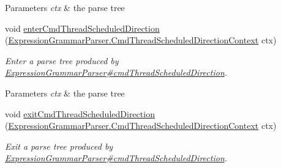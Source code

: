 \begin{DoxyCompactItemize}
\begin{DoxyCompactList}
\begin{DoxyParams}{Parameters}
{\em ctx} & the parse tree\\
\hline
\end{DoxyParams}
 \end{DoxyCompactList}\item 
void \hyperlink{classgov_1_1nasa_1_1jpf_1_1inspector_1_1server_1_1expression_1_1parser_1_1_expression_grammar_base_listener_a6fd4fec4668e2f124aa16d13c17d75f9}{enter\+Cmd\+Thread\+Scheduled\+Direction} (\hyperlink{classgov_1_1nasa_1_1jpf_1_1inspector_1_1server_1_1expression_1_1parser_1_1_expression_grammar_pa3ae49d5d83c380526042a5aff91ee0a2}{Expression\+Grammar\+Parser.\+Cmd\+Thread\+Scheduled\+Direction\+Context} ctx)
\begin{DoxyCompactList}\small\item\em Enter a parse tree produced by \hyperlink{classgov_1_1nasa_1_1jpf_1_1inspector_1_1server_1_1expression_1_1parser_1_1_expression_grammar_parser_aa1e14518e300b02c71f006c270cb4c41}{Expression\+Grammar\+Parser\#cmd\+Thread\+Scheduled\+Direction}.


\begin{DoxyParams}{Parameters}
{\em ctx} & the parse tree\\
\hline
\end{DoxyParams}
 \end{DoxyCompactList}\item 
void \hyperlink{classgov_1_1nasa_1_1jpf_1_1inspector_1_1server_1_1expression_1_1parser_1_1_expression_grammar_base_listener_aa4d738833499a5f67b879bb7d9d78961}{exit\+Cmd\+Thread\+Scheduled\+Direction} (\hyperlink{classgov_1_1nasa_1_1jpf_1_1inspector_1_1server_1_1expression_1_1parser_1_1_expression_grammar_pa3ae49d5d83c380526042a5aff91ee0a2}{Expression\+Grammar\+Parser.\+Cmd\+Thread\+Scheduled\+Direction\+Context} ctx)
\begin{DoxyCompactList}\small\item\em Exit a parse tree produced by \hyperlink{classgov_1_1nasa_1_1jpf_1_1inspector_1_1server_1_1expression_1_1parser_1_1_expression_grammar_parser_aa1e14518e300b02c71f006c270cb4c41}{Expression\+Grammar\+Parser\#cmd\+Thread\+Scheduled\+Direction}.



\end{DoxyCompactList}
\end{DoxyCompactItemize}
